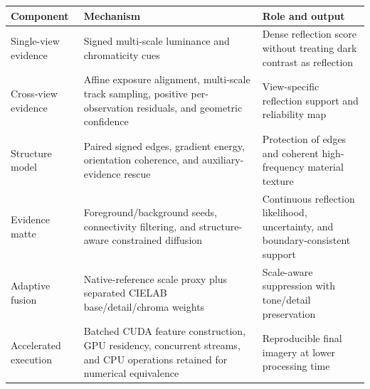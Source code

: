\begin{tabular}{lll}
\toprule
Component & Mechanism & Role and output \\
\midrule
Single-view evidence & Signed multi-scale luminance and chromaticity cues & Dense reflection score without treating dark contrast as reflection \\
Cross-view evidence & Affine exposure alignment, multi-scale track sampling, positive per-observation residuals, and geometric confidence & View-specific reflection support and reliability map \\
Structure model & Paired signed edges, gradient energy, orientation coherence, and auxiliary-evidence rescue & Protection of edges and coherent high-frequency material texture \\
Evidence matte & Foreground/background seeds, connectivity filtering, and structure-aware constrained diffusion & Continuous reflection likelihood, uncertainty, and boundary-consistent support \\
Adaptive fusion & Native-reference scale proxy plus separated CIELAB base/detail/chroma weights & Scale-aware suppression with tone/detail preservation \\
Accelerated execution & Batched CUDA feature construction, GPU residency, concurrent streams, and CPU operations retained for numerical equivalence & Reproducible final imagery at lower processing time \\
\bottomrule
\end{tabular}
